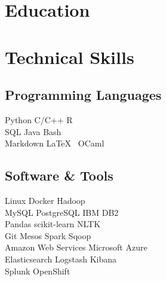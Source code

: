 \documentclass[]{deedy-resume-openfont}
\begin{document}

\section{Education}
\sectionsep


\section{Technical Skills}
\begin{minipage}[t]{.6\textwidth}
\subsection{Programming Languages}
Python \textbullet{}   C/C++ \textbullet{} R \\
SQL \textbullet{} Java \textbullet{} Bash \\
Markdown \textbullet{} \LaTeX\ \textbullet{} OCaml \\
\sectionsep
\end{minipage}
\hfill
\begin{minipage}[t]{.35\textwidth}
\subsection{Software \& Tools}
Linux \textbullet{} Docker \textbullet{} Hadoop\\
MySQL \textbullet{} PostgreSQL \textbullet{} IBM DB2\\
Pandas \textbullet{} scikit-learn \textbullet{} NLTK\\
Git \textbullet{} Mesos \textbullet{} Spark \textbullet{} Sqoop\\
Amazon Web Services \textbullet{} Microsoft Azure\\
Elasticsearch \textbullet{} Logstash \textbullet{} Kibana \\
Splunk \textbullet{} OpenShift \\
\end{minipage}
\end{document}
